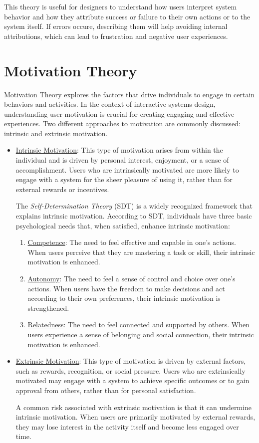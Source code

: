 This theory is useful for designers to understand how users interpret system behavior and how they attribute success or failure to their own actions or to the system itself. If errors occure, describing them will help avoiding internal attributions, which can lead to frustration and negative user experiences.


\section{Motivation Theory}

Motivation Theory explores the factors that drive individuals to engage in certain behaviors and activities. In the context of interactive systems design, understanding user motivation is crucial for creating engaging and effective experiences. Two different approaches to motivation are commonly discussed: intrinsic and extrinsic motivation.
\begin{itemize}
    \item \ul{Intrinsic Motivation}: This type of motivation arises from within the individual and is driven by personal interest, enjoyment, or a sense of accomplishment. Users who are intrinsically motivated are more likely to engage with a system for the sheer pleasure of using it, rather than for external rewards or incentives.
    
    The \emph{Self-Determination Theory} (SDT) is a widely recognized framework that explains intrinsic motivation. According to SDT, individuals have three basic psychological needs that, when satisfied, enhance intrinsic motivation:
    \begin{enumerate}
        \item \ul{Competence}: The need to feel effective and capable in one's actions. When users perceive that they are mastering a task or skill, their intrinsic motivation is enhanced.
        \item \ul{Autonomy}: The need to feel a sense of control and choice over one's actions. When users have the freedom to make decisions and act according to their own preferences, their intrinsic motivation is strengthened.
        \item \ul{Relatedness}: The need to feel connected and supported by others. When users experience a sense of belonging and social connection, their intrinsic motivation is enhanced.
    \end{enumerate}
    \item \ul{Extrinsic Motivation}: This type of motivation is driven by external factors, such as rewards, recognition, or social pressure. Users who are extrinsically motivated may engage with a system to achieve specific outcomes or to gain approval from others, rather than for personal satisfaction.
    
    A common risk associated with extrinsic motivation is that it can undermine intrinsic motivation. When users are primarily motivated by external rewards, they may lose interest in the activity itself and become less engaged over time.
\end{itemize}


